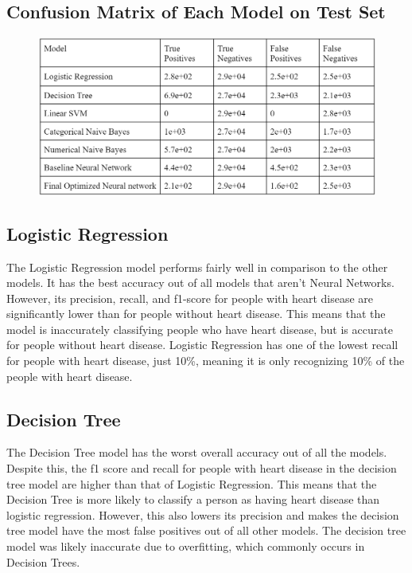 \documentclass[a4paper]{article}
\begin{document}
\subsection{Confusion Matrix of Each Model on Test Set}

\begin{figure}[H]
    \centering
    \includegraphics[width=12cm]{images/confusionmatrix.png}
\end{figure}

\subsection{Logistic Regression}

The Logistic Regression model performs fairly well in comparison to the other models. It has the best accuracy out of all models that aren’t Neural Networks. However, its precision, recall, and f1-score for people with heart disease are significantly lower than for people without heart disease. This means that the model is inaccurately classifying people who have heart disease, but is accurate for people without heart disease. Logistic Regression has one of the lowest recall for people with heart disease, just 10\%, meaning it is only recognizing 10\% of the people with heart disease.

\subsection{Decision Tree}

The Decision Tree model has the worst overall accuracy out of all the models. Despite this, the f1 score and recall for people with heart disease in the decision tree model are higher than that of Logistic Regression. This means that the Decision Tree is more likely to classify a person as having heart disease than logistic regression. However, this also lowers its precision and makes the decision tree model have the most false positives out of all other models. The decision tree model was likely inaccurate due to overfitting, which commonly occurs in Decision Trees.
\end{document}
